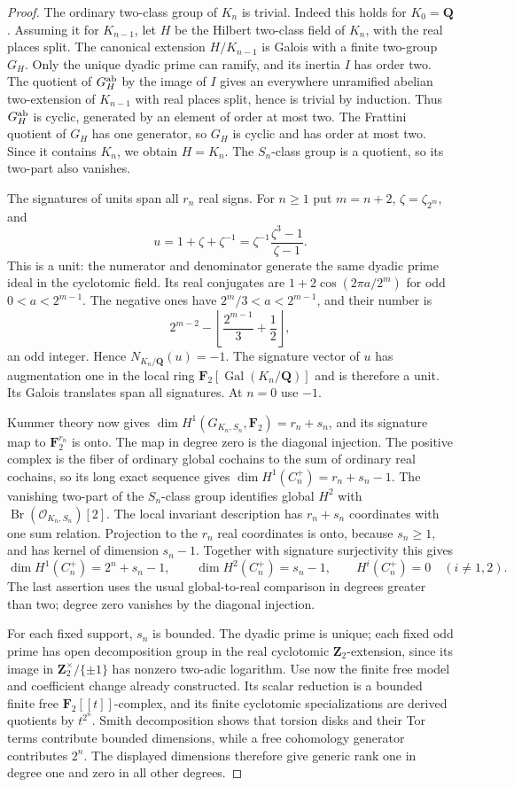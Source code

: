 \begin{proof}
The ordinary two-class group of $K_n$ is trivial. Indeed this holds
for $K_0=\mathbf Q$. Assuming it for $K_{n-1}$, let $H$ be the
Hilbert two-class field of $K_n$, with the real places split.
The canonical extension $H/K_{n-1}$ is Galois with a finite
two-group $G_H$. Only the unique dyadic prime can ramify, and its
inertia $I$ has order two. The quotient of $G_H^{\rm ab}$ by the image
of $I$ gives an everywhere unramified abelian two-extension of
$K_{n-1}$ with real places split, hence is trivial by induction.
Thus $G_H^{\rm ab}$ is cyclic, generated by an element of order at most
two. The Frattini quotient of $G_H$ has one generator, so $G_H$ is cyclic and
has order at most two. Since it contains $K_n$, we obtain $H=K_n$.
The $S_n$-class group is a quotient, so its two-part also vanishes.

The signatures of units span all $r_n$ real signs. For $n\ge1$ put
$m=n+2$, $\zeta=\zeta_{2^m}$, and
\[
 u=1+\zeta+\zeta^{-1}
   =\zeta^{-1}\frac{\zeta^3-1}{\zeta-1}.
\]
This is a unit: the numerator and denominator generate the same
dyadic prime ideal in the cyclotomic field. Its real conjugates are
$1+2\cos(2\pi a/2^m)$ for odd $0<a<2^{m-1}$.
The negative ones have $2^m/3<a<2^{m-1}$, and their number is
\[
 2^{m-2}-\left\lfloor\frac{2^{m-1}}3+\frac12\right\rfloor,
\]
an odd integer. Hence $N_{K_n/\mathbf Q}(u)=-1$.
The signature vector of $u$ has augmentation one in the local ring
$\mathbf F_2[\operatorname{Gal}(K_n/\mathbf Q)]$ and is therefore
a unit. Its Galois translates span all signatures. At $n=0$ use $-1$.

Kummer theory now gives
$\dim H^1(G_{K_n,S_n},\mathbf F_2)=r_n+s_n$, and its signature map
to $\mathbf F_2^{r_n}$ is onto. The map in degree zero is the diagonal
injection. The positive complex is the fiber of ordinary global
cochains to the sum of ordinary real cochains, so its long exact
sequence gives $\dim H^1(C_n^+)=r_n+s_n-1$.
The vanishing two-part of the $S_n$-class group identifies global
$H^2$ with $\operatorname{Br}(\mathcal O_{K_n,S_n})[2]$.
The local invariant description has $r_n+s_n$ coordinates with one
sum relation. Projection to the $r_n$ real coordinates is onto,
because $s_n\ge1$, and has kernel of dimension $s_n-1$.
Together with signature surjectivity this gives
\[
 \dim H^1(C_n^+)=2^n+s_n-1,\qquad
 \dim H^2(C_n^+)=s_n-1,
 \qquad H^i(C_n^+)=0\quad(i\ne1,2).
\]
The last assertion uses the usual global-to-real comparison in
degrees greater than two; degree zero vanishes by the diagonal injection.

For each fixed support, $s_n$ is bounded. The dyadic prime is unique;
each fixed odd prime has open decomposition group in the real
cyclotomic $\mathbf Z_2$-extension, since its image in
$\mathbf Z_2^\times/\{\pm1\}$ has nonzero two-adic logarithm.
Use now the finite free model and coefficient change already constructed.
Its scalar reduction is a bounded finite free $\mathbf F_2[[t]]$-complex,
and its finite cyclotomic specializations are derived quotients by
$t^{2^n}$. Smith decomposition shows that torsion disks and their Tor
terms contribute bounded dimensions, while a free cohomology generator
contributes $2^n$. The displayed dimensions therefore give generic
rank one in degree one and zero in all other degrees.


\end{proof}
